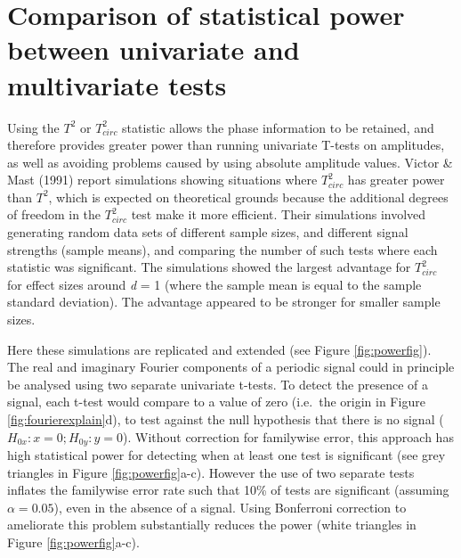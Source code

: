 \documentclass[]{article}
\begin{document}
\hypertarget{comparison-of-statistical-power-between-univariate-and-multivariate-tests}{%
\section{Comparison of statistical power between univariate and multivariate tests}\label{comparison-of-statistical-power-between-univariate-and-multivariate-tests}}

Using the \(T^2\) or \(T^2_{circ}\) statistic allows the phase information to be retained, and therefore provides greater power than running univariate T-tests on amplitudes, as well as avoiding problems caused by using absolute amplitude values. Victor \& Mast (1991) report simulations showing situations where \(T^2_{circ}\) has greater power than \(T^2\), which is expected on theoretical grounds because the additional degrees of freedom in the \(T^2_{circ}\) test make it more efficient. Their simulations involved generating random data sets of different sample sizes, and different signal strengths (sample means), and comparing the number of such tests where each statistic was significant. The simulations showed the largest advantage for \(T^2_{circ}\) for effect sizes around \emph{d} = 1 (where the sample mean is equal to the sample standard deviation). The advantage appeared to be stronger for smaller sample sizes.

Here these simulations are replicated and extended (see Figure \ref{fig:powerfig}). The real and imaginary Fourier components of a periodic signal could in principle be analysed using two separate univariate t-tests. To detect the presence of a signal, each t-test would compare to a value of zero (i.e.~the origin in Figure \ref{fig:fourierexplain}d), to test against the null hypothesis that there is no signal (\(H_{0x}: x = 0; H_{0y}: y = 0\)). Without correction for familywise error, this approach has high statistical power for detecting when at least one test is significant (see grey triangles in Figure \ref{fig:powerfig}a-c). However the use of two separate tests inflates the familywise error rate such that 10\% of tests are significant (assuming \(\alpha = 0.05\)), even in the absence of a signal. Using Bonferroni correction to ameliorate this problem substantially reduces the power (white triangles in Figure \ref{fig:powerfig}a-c).
\end{document}
